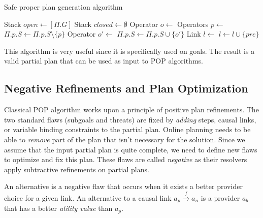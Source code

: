 \begin{algorithm}\caption{Safe proper plan generation algorithm}\label{alg:safeproperplan}\begin{algorithmic}[1]

\footnotesize
{} \State Stack \(open \gets [\Pi.G]\)
\State Stack \(closed \gets \emptyset\) 
\State Operator \(o \gets\) 
 \State {}
 \State Operators \(p \gets\)
 
 
\State \(\Pi.p.S \gets \Pi.p.S \setminus \{p\}\) \Continue
 \EndIf
 \State Operator \(o' \gets\) 
\label{line:safefirst}  \Continue
 \EndIf
  \State {} \EndIf
 \State \(\Pi.p.S \gets \Pi.p.S \cup \{o'\}\) \State Link \(l \gets\)
 
\State \(l \gets l \cup \{pre\}\) 
\EndFor
 \EndWhile
\EndFunction

\end{algorithmic}\end{algorithm}

This algorithm is very useful since it is specifically used on goals.
The result is a valid partial plan that can be used as input to POP
algorithms.

\subsection{Negative Refinements and Plan
Optimization}\label{sec:negative}

Classical POP algorithm works upon a principle of positive plan
refinements. The two standard flaws (subgoals and threats) are fixed by
\emph{adding} steps, causal links, or variable binding constraints to
the partial plan. Online planning needs to be able to \emph{remove} part
of the plan that isn't necessary for the solution. Since we assume that
the input partial plan is quite complete, we need to define new flaws to
optimize and fix this plan. These flaws are called \emph{negative} as
their resolvers apply subtractive refinements on partial plans.

\begin{definition}[Alternative]\label{def:alternative}

An alternative is a negative flaw that occurs when it exists a better
provider choice for a given link. An alternative to a causal link
\(a_p \xrightarrow{f} a_n\) is a provider \(a_b\) that has a better
\emph{utility value} than \(a_p\).

\end{definition}

